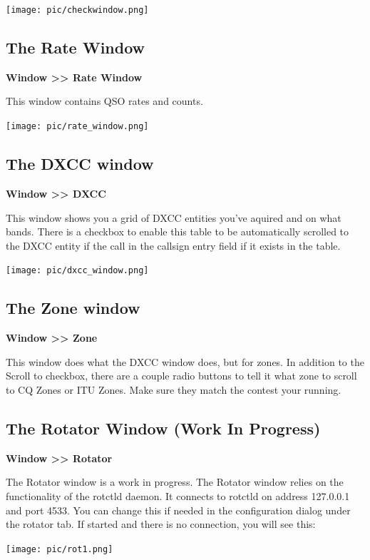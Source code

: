 \documentclass{article}
\begin{document}
\vspace{0.5cm}
\texttt{[image: pic/checkwindow.png]}
\newpage
\subsection{The Rate Window}

\textbf{Window >> Rate Window}

This window contains QSO rates and counts.

\vspace{0.5cm}
\texttt{[image: pic/rate\_window.png]}

\subsection{The DXCC window}
\textbf{Window >> DXCC}

This window shows you a grid of DXCC entities you've aquired and on what bands. There is a checkbox to enable this table to be automatically scrolled to the DXCC entity if the call in the callsign entry field if it exists in the table.

\vspace{0.5cm}
\texttt{[image: pic/dxcc\_window.png]}

\subsection{The Zone window}
\textbf{Window >> Zone}

This window does what the DXCC window does, but for zones. In addition to the Scroll to checkbox, there are a couple radio buttons to tell it what zone to scroll to CQ Zones or ITU Zones. Make sure they match the contest your running.

\subsection{The Rotator Window (Work In Progress)}
\textbf{Window >> Rotator}

The Rotator window is a work in progress. The Rotator window relies on the functionality of the rotctld daemon. It connects to rotctld on address 127.0.0.1 and port 4533. You can change this if needed in the configuration dialog under the rotator tab. If started and there is no connection, you will see this:

\vspace{0.5cm}
\texttt{[image: pic/rot1.png]}
\vspace{0.5cm}
\end{document}

